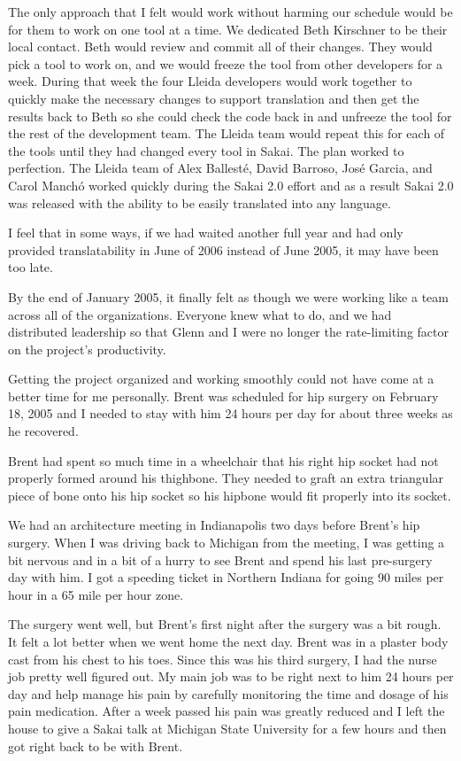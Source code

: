 \documentclass[12pt]{book}
\begin{document}
The only approach that I felt would work without harming our
schedule would be for them to work on one tool at a time.
We dedicated Beth Kirschner to be their local contact.  Beth would
review and commit all of their changes.  They would pick a tool
to work on, and we would freeze the tool from other developers
for a week.  During that week the four Lleida developers would
work together to quickly make the necessary changes to support
translation and then get the results back to Beth so she could
check the code back in and unfreeze the tool for the rest of
the development team.  The Lleida team would repeat this
for each of the tools until they had changed every tool in Sakai.
The plan worked to perfection.  The Lleida team of
Alex Ballest\'{e}, David Barroso, Jos\'{e} Garcia,
and Carol Manch\'{o} worked quickly during the
Sakai 2.0 effort and as a
result Sakai 2.0 was released with the ability to be easily
translated into any language.

I feel that in some ways, if we had waited another full year
and had only provided translatability in June of 2006 instead
of June 2005, it may have been too late.

By the end of January 2005, it finally felt as though we were working
like a team across all of the organizations.  Everyone knew
what to do, and we had distributed leadership so that Glenn and
I were no longer the rate-limiting factor on the project's
productivity.

Getting the project organized and working smoothly could
not have come at a better time for me personally. Brent was
scheduled for hip surgery on February 18, 2005 and I needed
to stay with him 24 hours per day for about three weeks
as he recovered.

Brent had spent so much time in a wheelchair
that his right hip socket had not properly formed around
his thighbone.  They needed to graft an extra triangular
piece of bone onto his hip socket so his hipbone would
fit properly into its socket.

We had an architecture meeting in Indianapolis two days
before Brent's hip surgery.  When I was
driving back to Michigan from the meeting,
I was getting a bit nervous and
in a bit of a hurry to see Brent and spend his last
pre-surgery day with him.  I got a speeding ticket in
Northern Indiana for going 90 miles per hour in a 65
mile per hour zone.

The surgery went well, but Brent's first night after the
surgery was a bit rough.  It felt a lot better when we went
home the next day.  Brent was in a plaster body cast from his
chest to his toes.  Since this was his third surgery,
I had the nurse job pretty well figured out.  My main job
was to be right next to him 24 hours per day and help manage
his pain by carefully monitoring the time and dosage
of his pain medication.
After a week passed his pain was greatly reduced and I
left the house to give a Sakai talk at Michigan State
University for a few hours and then got right back
to be with Brent.
\end{document}
